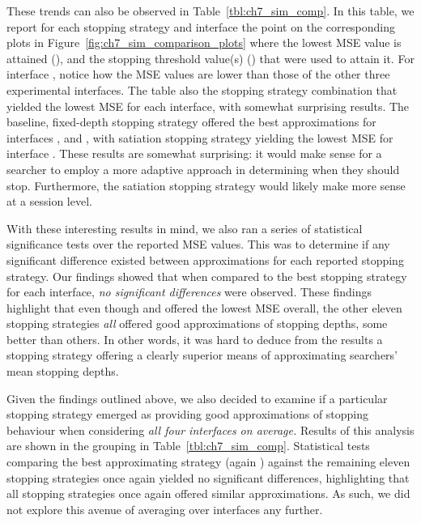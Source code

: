 These trends can also be observed in Table~\ref{tbl:ch7_sim_comp}. In this table, we report for each stopping strategy and interface the point on the corresponding plots in Figure~\ref{fig:ch7_sim_comparison_plots} where the lowest MSE value is attained (), and the stopping threshold value(s) () that were used to attain it. For interface , notice how the MSE values are lower than those of the other three experimental interfaces. The table also  the stopping strategy combination that yielded the lowest MSE for each interface, with somewhat surprising results. The baseline, fixed-depth stopping strategy  offered the best approximations for interfaces ,  and , with satiation stopping strategy  yielding the lowest MSE for interface . These results are somewhat surprising: it would make sense for a searcher to employ a more adaptive approach in determining when they should stop. Furthermore, the satiation stopping strategy would likely make more sense at a session level.


With these interesting results in mind, we also ran a series of statistical significance tests over the reported MSE values. This was to determine if any significant difference existed between approximations for each reported stopping strategy. Our findings showed that when compared to the best stopping strategy for each interface, \emph{no significant differences} were observed. These findings highlight that even though  and  offered the lowest MSE overall, the other eleven stopping strategies \emph{all} offered good approximations of stopping depths, some better than others. In other words, it was hard to deduce from the results a stopping strategy offering a clearly superior means of approximating searchers' mean stopping depths.

Given the findings outlined above, we also decided to examine if a particular stopping strategy emerged as providing good approximations of stopping behaviour when considering \emph{all four interfaces on average.} Results of this analysis are shown in the  grouping in Table~\ref{tbl:ch7_sim_comp}. Statistical tests comparing the best approximating strategy (again ) against the remaining eleven stopping strategies once again yielded no significant differences, highlighting that all stopping strategies once again offered similar approximations. As such, we did not explore this avenue of averaging over interfaces any further.

